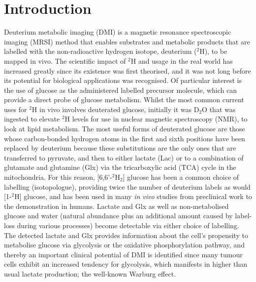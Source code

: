 \documentclass[class=article, crop=false]{standalone}
\begin{document}
 
\label{Chap:Glucose}

\section{Introduction}

Deuterium metabolic imaging (DMI) is a magnetic resonance spectroscopic imaging (MRSI) method that enables substrates and metabolic products that are labelled with the non-radioactive hydrogen isotope, deuterium ($^2$H), to be mapped in vivo. The scientific impact of $^2$H and usage in the real world has increased greatly since its existence was first theorised\cite{Urey1932AConcentration}, and it was not long before its potential for biological applications was recognised\cite{Schoenheimer1935DeuteriumMetabolism, Schoenheimer1938TheMetabolism}. Of particular interest is the use of glucose as the administered labelled precursor molecule, which can provide a direct probe of glucose metabolism. Whilst the most common current uses for $^2$H in vivo involves deuterated glucose, initially it was D$_2$O that was ingested to elevate $^2$H levels for use in nuclear magnetic spectroscopy (NMR)\cite{Brereton1986PreliminarySpectroscopy, Irving1987InSpectroscopy}, to look at lipid metabolism. The most useful forms of deuterated glucose are those whose carbon-bonded hydrogen atoms in the first and sixth positions have been replaced by deuterium because these substitutions are the only ones that are transferred to pyruvate, and then to either lactate (Lac) or to a combination of glutamate and glutamine (Glx) via the tricarboxylic acid (TCA) cycle in the mitochondria. For this reason, [6,6'-$^2$H$_2$] glucose has been a common choice of labelling (isotopologue), providing twice the number of deuterium labels as would [1-$^2$H] glucose, and has been used in many \textit{in vivo} studies from preclinical work\cite{Lu2017QuantitativeSpectroscopy, Meerwaldt2023InImaging} to the demonstration in humans\cite{DeFeyter2018DeuteriumVivo, Roig2022Deuterium7T}. Lactate and Glx as well as non-metabolised glucose and water (natural abundance plus an additional amount caused by label-loss during various processes) become detectable via either choice of labelling. The detected lactate and Glx provides information about the cell’s propensity to metabolise glucose via glycolysis or the oxidative phosphorylation pathway, and thereby an important clinical potential of DMI is identified since many tumour cells exhibit an increased tendency for glycolysis, which manifests in higher than usual lactate production;  the well-known Warburg effect\cite{Warburg1956OnCells}.    
\end{document}
